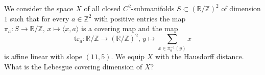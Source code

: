We consider the space $X$ of all closed $C^2$-submanifolds $S\subset(\mathbb{R}/\mathbb{Z})^2$ of dimension $1$ such that
for every $a\in\mathbb{Z}^2$ with positive entries the map $\pi_a\colon S\to\mathbb{R}/\mathbb{Z},\, x\mapsto\langle x,a\rangle$ is a covering map and the map
        \begin{equation*}
            \mathrm{tr}_a\colon\mathbb{R}/\mathbb{Z}\to(\mathbb{R}/\mathbb{Z})^2,\, y\mapsto\sum_{x\in \pi_a^{-1}(y)}x
        \end{equation*}
is affine linear with slope $(11,5)$. We equip $X$ with the Hausdorff distance. What is the Lebesgue covering dimension of $X$?
